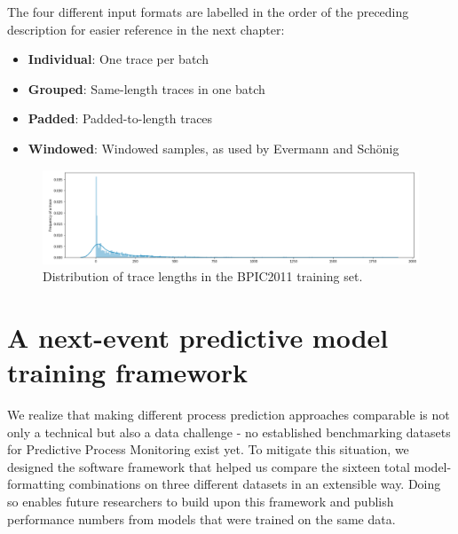 The four different input formats are labelled in the order of the preceding description for easier reference in the next chapter:
\begin{itemize}
    \item\textbf{Individual}: One trace per batch
    \item\textbf{Grouped}: Same-length traces in one batch
    \item\textbf{Padded}: Padded-to-length traces
    \item\textbf{Windowed}: Windowed samples, as used by Evermann and Schönig
\end{itemize}

\begin{figure}[ht!]
    \centering
    \includegraphics[width=.9\textwidth]{gfx/frequency-distribution.png}
    \caption{Distribution of trace lengths in the BPIC2011 training set.}
    \label{fig:bpic2011-length-distribution}
\end{figure}

\section{A next-event predictive model training framework}
\label{sec:contrib:training-framework}
We realize that making different process prediction approaches comparable is not only a technical but also a data challenge - no established benchmarking datasets for Predictive Process Monitoring exist yet.
To mitigate this situation, we designed the software framework that helped us compare the sixteen total model-formatting combinations on three different datasets in an extensible way. Doing so enables future researchers to build upon this framework and publish performance numbers from models that were trained on the same data.\\

